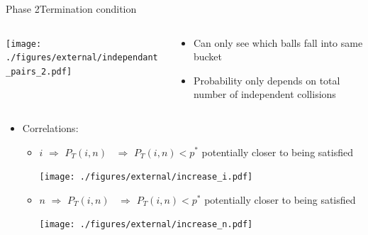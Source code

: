 \documentclass[aspectratio=169, hyperref={colorlinks=true, allcolors=SecondaryColor}, c]{beamer}
\begin{document}
	\begin{frame}[fragile]{Phase 2}{Termination condition}
		\begin{columns}
			\begin{column}{0.5\textwidth}
				\texttt{[image: ./figures/external/independant\_pairs\_2.pdf]}
			\end{column}
			\begin{column}{0.5\textwidth}
				\begin{itemize}
					\item Can only see which balls fall into same bucket
					\item Probability \alert{only} depends on \alert{total number of independent collisions}
				\end{itemize}
			\end{column}
		\end{columns}
		\begin{itemize}
			\item \alert{Correlations}:
			\begin{itemize}
				\item {\thickuparrow} $i$ \alert{$\Rightarrow$} $P_T(i, n)$ {\thickdownarrow}\, \alert{$\Rightarrow$} $P_T(i, n) < p^*$ potentially closer to being satisfied %
				\vspace{-0.4cm}

				\texttt{[image: ./figures/external/increase\_i.pdf]} %
				\item {\thickuparrow} $n$ \alert{$\Rightarrow$} $P_T(i, n)$ {\thickdownarrow}\, \alert{$\Rightarrow$} $P_T(i, n) < p^*$ potentially closer to being satisfied %
				\vspace{-0.4cm}

				\texttt{[image: ./figures/external/increase\_n.pdf]} %
			\end{itemize}
		\end{itemize}
	\end{frame}
\end{document}

